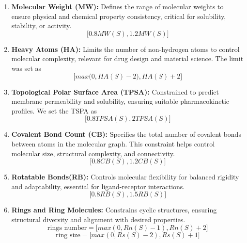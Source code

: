 \documentclass[10pt]{article} %
\begin{document}
    \begin{enumerate}
    \item \textbf{Molecular Weight (MW):} Defines the range of molecular weights to ensure physical and chemical property consistency, critical for solubility, stability, or activity. 
    \[
    \Big[0.8 MW(S) , 1.2MW(S)\Big]
    \]
    
    \item \textbf{Heavy Atoms (HA):} Limits the number of non-hydrogen atoms to control molecular complexity, relevant for drug design and material science. The limit was set as 
    \[
    \Big[max\big(0, HA(S) -2\big) , HA(S)+2\Big]
    \]
    
    \item \textbf{Topological Polar Surface Area (TPSA):} Constrained to predict membrane permeability and solubility, ensuring suitable pharmacokinetic profiles.
    We set the TSPA as
        \[
    \Big[0.8 TPSA(S) , 2TPSA(S)\Big]
    \]

    
    \item \textbf{Covalent Bond Count (CB):} Specifies the total number of covalent bonds between atoms in the molecular graph. This constraint helps control molecular size, structural complexity, and connectivity.
    \[
    \Big[0.8 CB(S) , 1.2 CB(S)\Big]
    \]

    \item \textbf{Rotatable Bonds(RB):} Controls molecular flexibility for balanced rigidity and adaptability, essential for ligand-receptor interactions.
            \[
    \Big[0.8 RB(S) , 1.5 RB(S)\Big]
    \]

    \item \textbf{Rings and Ring Molecules:} Constrains cyclic structures, ensuring structural diversity and alignment with desired properties.
    \[
    \text{rings number} = \Big[max(0,Rn(S)-1) , Rn(S)+2\Big]
    \]
    \[
    \text{ring size} = \Big[ max(0,Rs(S)-2) , Rs(S)+1\Big]
    \]


\end{enumerate}
\end{document}
